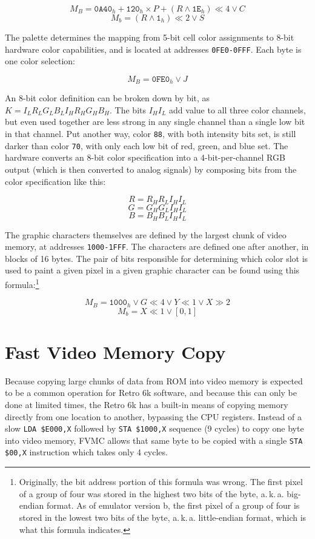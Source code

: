 \documentclass[12pt]{{memoir}}
\begin{document}
$$M_B = \texttt{0A40}_h + \texttt{120}_h \times P + (R \wedge \texttt{1E}_h) \ll 4 \vee C$$
$$M_b = (R \wedge \texttt{1}_h) \ll 2 \vee S$$

\pagebreak[0]

The palette determines the mapping from 5-bit cell color assignments to 8-bit hardware color capabilities, and is located at addresses \texttt{0FE0-0FFF}. Each byte is one color selection:

\nopagebreak[4]

$$M_B = \texttt{0FE0}_h \vee J$$

An 8-bit color definition can be broken down by bit, as $K = I_LR_LG_LB_LI_HR_HG_HB_H$. The bits $I_HI_L$ add value to all three color channels, but even used together are less strong in any single channel than a single low bit in that channel. Put another way, color \texttt{88}, with both intensity bits set, is still darker than color \texttt{70}, with only each low bit of red, green, and blue set. The hardware converts an 8-bit color specification into a 4-bit-per-channel RGB output (which is then converted to analog signals) by composing bits from the color specification like this:

$$R = R_HR_LI_HI_L$$
$$G = G_HG_LI_HI_L$$
$$B = B_HB_LI_HI_L$$

The graphic characters themselves are defined by the largest chunk of video memory, at addresses \texttt{1000-1FFF}. The characters are defined one after another, in blocks of 16 bytes. The pair of bits responsible for determining which color slot is used to paint a given pixel in a given graphic character can be found using this formula:\footnote{Originally, the bit address portion of this formula was wrong. The first pixel of a group of four was stored in the highest two bits of the byte, a.\,k.\,a. big-endian format. As of emulator version b, the first pixel of a group of four is stored in the lowest two bits of the byte, a.\,k.\,a. little-endian format, which is what this formula indicates.}

$$M_B = \texttt{1000}_h \vee G \ll 4 \vee Y \ll 1 \vee X \gg 2$$
$$M_b = X \ll 1 \vee [0,1]$$

\section{Fast Video Memory Copy}
\label{sec:fvmc}

Because copying large chunks of data from ROM into video memory is expected to be a common operation for Retro 6k software, and because this can only be done at limited times, the Retro 6k has a built-in means of copying memory directly from one location to another, bypassing the CPU registers. Instead of a slow \texttt{LDA \$E000,X} followed by \texttt{STA \$1000,X} sequence (9 cycles) to copy one byte into video memory, FVMC allows that same byte to be copied with a single \texttt{STA \$00,X} instruction which takes only 4 cycles.
\end{document}
